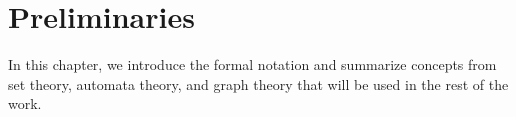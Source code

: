 \chapter{Preliminaries}
\label{chapter:preliminaries}

In this chapter, we introduce the formal notation and summarize concepts from set
theory, automata theory, and graph theory that will be used in the rest of the work.








